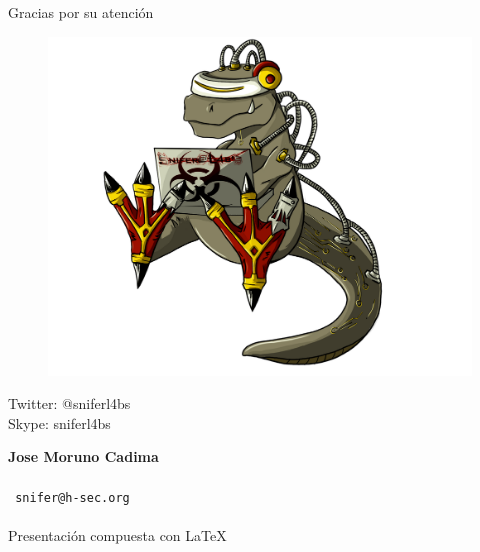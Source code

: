 \documentclass[12pt]{beamer} %
\makeatletter
\def\autor{
  Jose Moruno Cadima\\
}
\def\email{
  snifer@h-sec.org\\

}
\makeatother
\begin{document}
\begin{blankslide}
  \begin{center}
    {\Large Gracias por su atención}
  \end{center}
   \begin{figure}[h]
      \begin{center}
        \includegraphics[height=0.5\textheight]{img/sniferl4bs.png}
      \end{center}
    \end{figure}
  \begin{center}
    {\Large Twitter: @sniferl4bs}\\
    {\Large Skype:   sniferl4bs}
  \end{center}
  \begin{flushright}
    {\bf \autor}\\
    {\tt \email}\\[0.2cm]
    {\scriptsize Presentación compuesta con \LaTeX\ }
  \end{flushright}
\end{blankslide}
\end{document}
